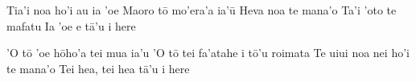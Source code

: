 \transpose{\shift}
\beginverse
Tia'i noa ho'i au ia 'oe
Maoro t\={o} mo'era'a ia'\={u}
Heva noa te mana'o
Ta'i 'oto te mafatu
Ia 'oe e t\={a}'u i here
\endverse

\beginchorus
'O t\={o} 'oe h\={o}ho'a tei mua ia'u
'O t\={o} tei fa'atahe i t\={o}'u roimata
Te uiui noa nei ho'i te mana'o
Tei hea, tei hea t\={a}'u i here
\endchorus

\endsong
